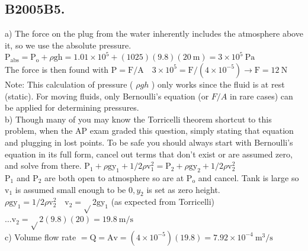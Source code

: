 \begin{enumerate}
\section*{B2005B5.}
a) The force on the plug from the water inherently includes the atmosphere above it, so we use the absolute pressure. $\mathrm{P}_{\mathrm{abs}}=\mathrm{P}_{\mathrm{o}}+\rho \mathrm{gh}=1.01 \times 10^{5}+(1025)(9.8)(20 \mathrm{~m})=3 \times 10^{5} \mathrm{~Pa}$\\
The force is then found with $\mathrm{P}=\mathrm{F} / \mathrm{A} \quad 3 \times 10^{5}=\mathrm{F} /\left(4 \times 10^{-5}\right) \rightarrow \mathrm{F}=12 \mathrm{~N}$\\
Note: This calculation of pressure ( $\rho g h$ ) only works since the fluid is at rest (static). For moving fluids, only Bernoulli's equation (or $F / A$ in rare cases) can be applied for determining pressures.\\
b) Though many of you may know the Torricelli theorem shortcut to this problem, when the AP exam graded this question, simply stating that equation and plugging in lost points. To be safe you should always start with Bernoulli's equation in its full form, cancel out terms that don't exist or are assumed zero, and solve from there. $\mathrm{P}_{1}+\rho \mathrm{gy}_{1}+1 / 2 \rho \mathrm{v}_{1}^{2}=\mathrm{P}_{2}+\rho \mathrm{gy}_{2}+1 / 2 \rho \mathrm{v}_{2}^{2}$\\
$\mathrm{P}_{1}$ and $\mathrm{P}_{2}$ are both open to atmosphere so are at $\mathrm{P}_{\mathrm{o}}$ and cancel. Tank is large so $\mathrm{v}_{1}$ is assumed small enough to be $0, y_{2}$ is set as zero height.\\
$\rho \mathrm{gy}_{1}=1 / 2 \rho \mathrm{v}_{2}^{2} \quad \mathrm{v}_{2}=\sqrt{ } 2 \mathrm{gy}_{1}$ (as expected from Torricelli) $\ldots \mathrm{v}_{2}=\sqrt{ } 2(9.8)(20)=19.8 \mathrm{~m} / \mathrm{s}$\\
c) Volume flow rate $=\mathrm{Q}=\mathrm{Av}=\left(4 \times 10^{-5}\right)(19.8)=7.92 \times 10^{-4} \mathrm{~m}^{3} / \mathrm{s}$


\end{enumerate}
